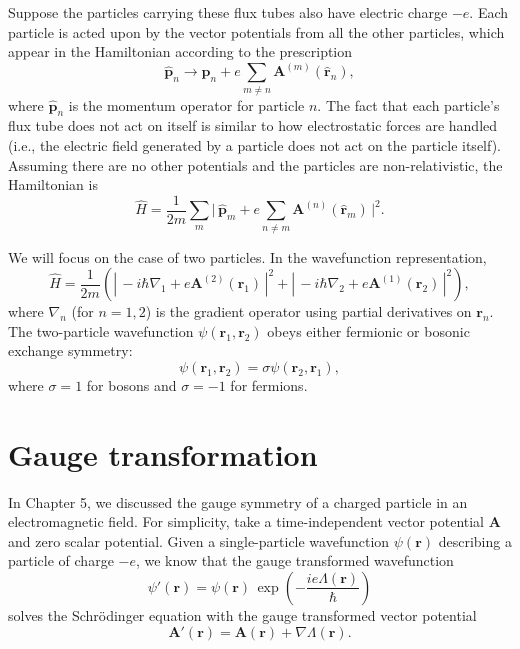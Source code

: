 \documentclass[pra,12pt]{revtex4}
\begin{document}
Suppose the particles carrying these flux tubes also have electric
charge $-e$.  Each particle is acted upon by the vector potentials
from all the other particles, which appear in the Hamiltonian
according to the prescription
\begin{equation}
  \hat{\mathbf{p}}_n \rightarrow \hat{\mathbf{p}}_n
  + e \sum_{m \ne n} \mathbf{A}^{(m)}(\hat{\mathbf{r}}_n),
\end{equation}
where $\hat{\mathbf{p}}_n$ is the momentum operator for particle $n$.
The fact that each particle's flux tube does not act on itself is
similar to how electrostatic forces are handled (i.e., the electric
field generated by a particle does not act on the particle itself).
Assuming there are no other potentials and the particles are
non-relativistic, the Hamiltonian is
\begin{equation}
  \hat{H} = \frac{1}{2m} \sum_m \Big| \,\hat{\mathbf{p}}_m
  + e \sum_{n \ne m} \mathbf{A}^{(n)}(\hat{\mathbf{r}}_m)\,\Big|^2.
\end{equation}

We will focus on the case of two particles.  In the wavefunction
representation,
\begin{equation}
  \hat{H} = \frac{1}{2m} \left( \left| \, -i\hbar \nabla_1
  + e\mathbf{A}^{(2)}(\mathbf{r}_1)\,\right|^2
  + \left| \, -i\hbar \nabla_2
  + e\mathbf{A}^{(1)}(\mathbf{r}_2)\,\right|^2\right),
  \label{HamA}
\end{equation}
where $\nabla_n$ (for $n = 1,2$) is the gradient operator using
partial derivatives on $\mathbf{r}_n$.  The two-particle wavefunction
$\psi(\mathbf{r}_1, \mathbf{r}_2)$ obeys either fermionic or bosonic
exchange symmetry:
\begin{equation}
  \psi(\mathbf{r}_1, \mathbf{r}_2) = \sigma \psi(\mathbf{r}_2, \mathbf{r}_1),
  \label{exchange}
\end{equation}
where $\sigma = 1$ for bosons and $\sigma = -1$ for fermions.

\section{Gauge transformation}

In Chapter 5, we discussed the gauge symmetry of a charged particle in
an electromagnetic field.  For simplicity, take a time-independent
vector potential $\mathbf{A}$ and zero scalar potential.  Given a
single-particle wavefunction $\psi(\mathbf{r})$ describing a particle
of charge $-e$, we know that the gauge transformed wavefunction
\begin{equation}
  \psi'(\mathbf{r}) = \psi(\mathbf{r}) \,
  \exp\!\left(-\frac{ie\Lambda(\mathbf{r})}{\hbar}\right)
\end{equation}
solves the Schr\"odinger equation with the gauge transformed vector
potential
\begin{equation*}
  \mathbf{A}'(\mathbf{r}) = \mathbf{A}(\mathbf{r}) + \nabla \Lambda(\mathbf{r}).
\end{equation*}
\end{document}
